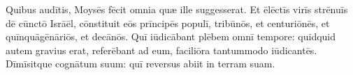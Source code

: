 Quibus audītis, Moysēs fēcit omnia quæ ille
suggesserat. 
Et ēlēctīs virīs strēnuīs
dē cūnctō Isrāēl, cōnstituit eōs prīncipēs populī, tribūnōs, et
centuriōnēs, et quīnquāgēnāriōs, et decānōs. 
Quī iūdicābant
plēbem omnī tempore: quidquid autem gravius erat,
referēbant ad eum, faciliōra tantummodo iūdicantēs. 
Dīmīsitque
cognātum suum: quī reversus abiit in terram suam. 
